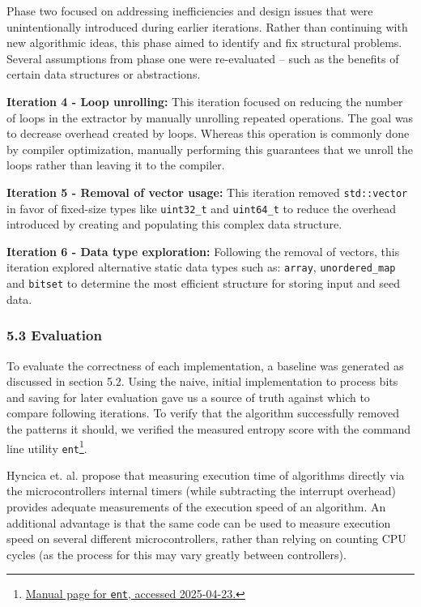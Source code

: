Phase two focused on addressing inefficiencies and design issues that were unintentionally introduced during earlier iterations. Rather than continuing with new algorithmic ideas, this phase aimed to identify and fix structural problems. Several assumptions from phase one were re-evaluated -- such as the benefits of certain data structures or abstractions.

\textbf{Iteration 4 - Loop unrolling:} This iteration focused on reducing the number of loops in the extractor by manually unrolling repeated operations. The goal was to decrease overhead created by loops. Whereas this operation is commonly done by compiler optimization, manually performing this guarantees that we unroll the loops rather than leaving it to the compiler.

\textbf{Iteration 5 - Removal of vector usage:} This iteration removed \texttt{std::vector} in favor of fixed-size types like \texttt{uint32\_t} and \texttt{uint64\_t} to reduce the overhead introduced by creating and populating this complex data structure.

\textbf{Iteration 6 - Data type exploration:} Following the removal of vectors, this iteration explored alternative static data types such as: \texttt{array}, \texttt{unordered\_map} and \texttt{bitset} to determine the most efficient structure for storing input and seed data.

\hypertarget{evaluation}{%
\subsubsection{5.3 Evaluation}\label{evaluation}}

To evaluate the correctness of each implementation, a baseline was generated as discussed in section 5.2. Using the naive, initial implementation to process bits and saving for later evaluation gave us a source of truth against which to compare following iterations. To verify that the algorithm successfully removed the patterns it should, we verified the measured entropy score with the command line utility \texttt{ent}\footnote{\href{https://manpages.ubuntu.com/manpages/trusty/man1/ent.1.html}{Manual page for \texttt{ent}, accessed 2025-04-23.}}.

Hyncica et. al. \cite{micromeasurements} propose that measuring execution time of algorithms directly via the microcontrollers internal timers (while subtracting the interrupt overhead) provides adequate measurements of the execution speed of an algorithm. An additional advantage is that the same code can be used to measure execution speed on several different microcontrollers, rather than relying on counting CPU cycles (as the process for this may vary greatly between controllers).

